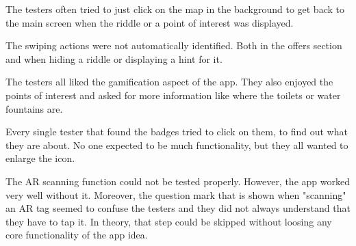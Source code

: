 \documentclass[10pt,twocolumn]{article} %
\begin{document}
The testers often tried to just click on the map in the background to get back to the main screen when the riddle or a point of interest was displayed. 

The swiping actions were not automatically identified. Both in the offers section and when hiding a riddle or displaying a hint for it.

The testers all liked the gamification aspect of the app. They also enjoyed the points of interest and asked for more information like where the toilets or water fountains are. 

Every single tester that found the badges tried to click on them, to find out what they are about. No one expected to be much functionality, but they all wanted to enlarge the icon. 

The AR scanning function could not be tested properly. However, the app worked very well without it. Moreover, the question mark that is shown when "scanning" an AR tag seemed to confuse the testers and they did not always understand that they have to tap it. In theory, that step could be skipped without loosing any core functionality of the app idea.
\end{document}
